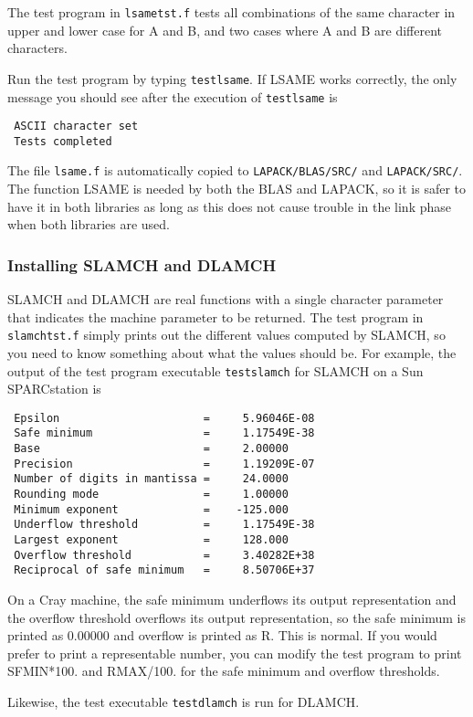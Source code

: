 \documentclass[11pt]{report}
\begin{document}
The test program in \texttt{lsametst.f} tests all combinations of
the same character in upper and lower case for A and B, and two
cases where A and B are different characters.

Run the test program by typing \texttt{testlsame}.
If LSAME works correctly, the only message you should see after the
execution of \texttt{testlsame} is
\begin{verbatim}
 ASCII character set
 Tests completed
\end{verbatim}
The file \texttt{lsame.f} is automatically copied to
\texttt{LAPACK/BLAS/SRC/} and \texttt{LAPACK/SRC/}. 
The function LSAME is needed by both the BLAS and LAPACK, so it is safer
to have it in both libraries as long as this does not cause trouble
in the link phase when both libraries are used.

\subsubsection{Installing SLAMCH and DLAMCH}

SLAMCH and DLAMCH are real functions with a single character parameter
that indicates the machine parameter to be returned.  The test 
program in \texttt{slamchtst.f}
simply prints out the different values computed by SLAMCH,
so you need to know something about what the values should be. 
For example, the output of the test program executable \texttt{testslamch}
for SLAMCH on a Sun SPARCstation is
\begin{verbatim}
 Epsilon                      =     5.96046E-08
 Safe minimum                 =     1.17549E-38
 Base                         =     2.00000
 Precision                    =     1.19209E-07
 Number of digits in mantissa =     24.0000
 Rounding mode                =     1.00000
 Minimum exponent             =    -125.000
 Underflow threshold          =     1.17549E-38
 Largest exponent             =     128.000
 Overflow threshold           =     3.40282E+38
 Reciprocal of safe minimum   =     8.50706E+37
\end{verbatim}
On a Cray machine, the safe minimum underflows its output
representation and the overflow threshold overflows its output
representation, so the safe minimum is printed as 0.00000 and overflow
is printed as R.  This is normal.
If you would prefer to print a representable number, you can modify
the test program to print SFMIN*100. and RMAX/100. for the safe
minimum and overflow thresholds.

Likewise, the test executable \texttt{testdlamch} is run for DLAMCH.
\end{document}

